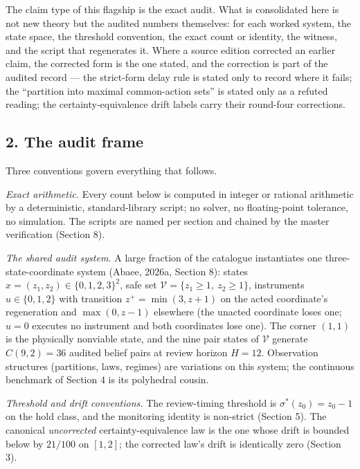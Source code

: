 \documentclass[10pt,twocolumn]{article}
\theoremstyle{definition}
\begin{document}
The claim type of this flagship is the exact audit. What is consolidated here
is not new theory but the audited numbers themselves: for each worked system,
the state space, the threshold convention, the exact count or identity, the
witness, and the script that regenerates it. Where a source edition corrected
an earlier claim, the corrected form is the one stated, and the correction is
part of the audited record --- the strict-form delay rule is stated only to
record where it fails; the ``partition into maximal common-action sets'' is
stated only as a refuted reading; the certainty-equivalence drift labels carry
their round-four corrections.

\subsection{2. The audit frame}\label{audit-frame}

Three conventions govern everything that follows.

\emph{Exact arithmetic.} Every count below is computed in integer or rational
arithmetic by a deterministic, standard-library script; no solver, no
floating-point tolerance, no simulation. The scripts are named per section and
chained by the master verification (Section 8).

\emph{The shared audit system.} A large fraction of the catalogue instantiates
one three-state-coordinate system (Abaee, 2026a, Section 8): states
\(x = (z_1, z_2)\in\{0,1,2,3\}^2\), safe set
\(\mathcal{V} = \{z_1 \ge 1,\ z_2 \ge 1\}\), instruments
\(u \in \{0, 1, 2\}\) with transition
\(z^{+} = \min(3, z + 1)\) on the acted coordinate's regeneration and
\(\max(0, z - 1)\) elsewhere (the unacted coordinate loses one; \(u = 0\)
executes no instrument and both coordinates lose one). The corner \((1,1)\)
is the physically nonviable state, and the nine pair states of
\(\mathcal{V}\) generate \(C(9,2) = 36\) audited belief pairs at review
horizon \(H = 12\). Observation structures (partitions, laws, regimes) are
variations on this system; the continuous benchmark of Section 4 is its
polyhedral cousin.

\emph{Threshold and drift conventions.} The review-timing threshold is
\(\sigma^{*}(z_0) = z_0 - 1\) on the hold class, and the monitoring identity
is non-strict (Section 5). The canonical \emph{uncorrected}
certainty-equivalence law is the one whose drift is bounded below by
\(21/100\) on \([1,2]\); the corrected law's drift is identically zero
(Section 3).
\end{document}
